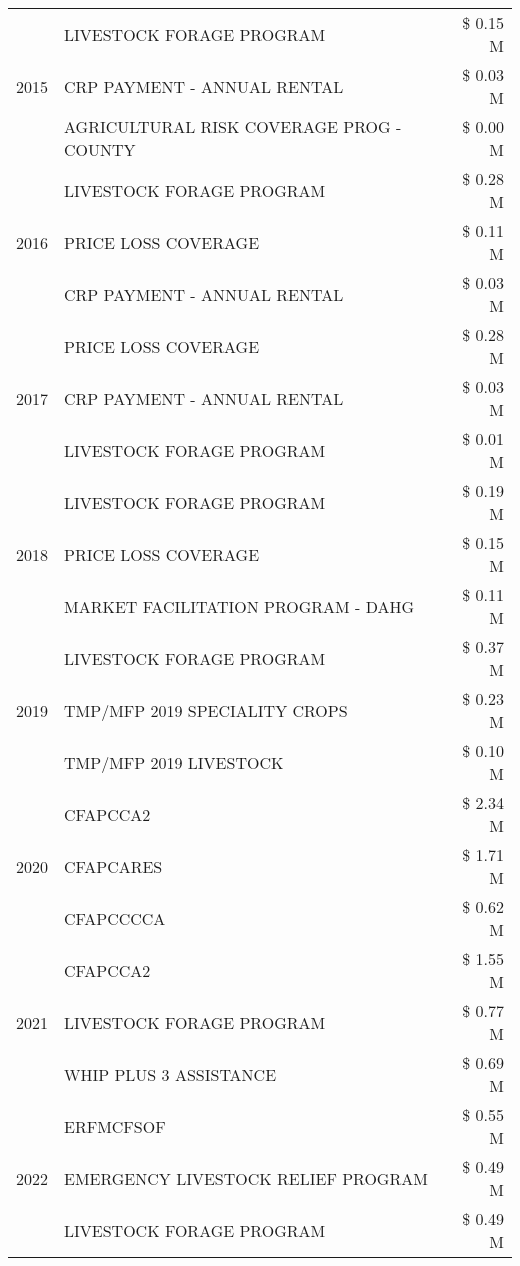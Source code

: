 \begin{tabular}{llr}
\cline{1-3}
\multirow[t]{3}{*}{2015} & LIVESTOCK FORAGE PROGRAM & \$ 0.15 M \\
 & CRP PAYMENT - ANNUAL RENTAL & \$ 0.03 M \\
 & AGRICULTURAL RISK COVERAGE PROG - COUNTY & \$ 0.00 M \\
\cline{1-3}
\multirow[t]{3}{*}{2016} & LIVESTOCK FORAGE PROGRAM & \$ 0.28 M \\
 & PRICE LOSS COVERAGE & \$ 0.11 M \\
 & CRP PAYMENT - ANNUAL RENTAL & \$ 0.03 M \\
\cline{1-3}
\multirow[t]{3}{*}{2017} & PRICE LOSS COVERAGE & \$ 0.28 M \\
 & CRP PAYMENT - ANNUAL RENTAL & \$ 0.03 M \\
 & LIVESTOCK FORAGE PROGRAM & \$ 0.01 M \\
\cline{1-3}
\multirow[t]{3}{*}{2018} & LIVESTOCK FORAGE PROGRAM & \$ 0.19 M \\
 & PRICE LOSS COVERAGE & \$ 0.15 M \\
 & MARKET FACILITATION PROGRAM - DAHG & \$ 0.11 M \\
\cline{1-3}
\multirow[t]{3}{*}{2019} & LIVESTOCK FORAGE PROGRAM & \$ 0.37 M \\
 & TMP/MFP 2019 SPECIALITY CROPS & \$ 0.23 M \\
 & TMP/MFP 2019 LIVESTOCK & \$ 0.10 M \\
\cline{1-3}
\multirow[t]{3}{*}{2020} & CFAPCCA2 & \$ 2.34 M \\
 & CFAPCARES & \$ 1.71 M \\
 & CFAPCCCCA & \$ 0.62 M \\
\cline{1-3}
\multirow[t]{3}{*}{2021} & CFAPCCA2 & \$ 1.55 M \\
 & LIVESTOCK FORAGE PROGRAM & \$ 0.77 M \\
 & WHIP PLUS 3 ASSISTANCE & \$ 0.69 M \\
\cline{1-3}
\multirow[t]{3}{*}{2022} & ERFMCFSOF & \$ 0.55 M \\
 & EMERGENCY LIVESTOCK RELIEF PROGRAM & \$ 0.49 M \\
 & LIVESTOCK FORAGE PROGRAM & \$ 0.49 M \\
\cline{1-3}
\bottomrule
\end{tabular}
